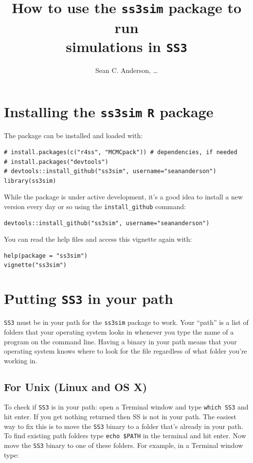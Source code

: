 \documentclass[12pt]{article}
\title{How to use the \texttt{ss3sim} package to run\\simulations in \texttt{SS3}}
\author{Sean C. Anderson, \ldots}
\date{}
\begin{document}
\maketitle

\section{Installing the \texttt{ss3sim} \texttt{R} package}

The package can be installed and loaded with:

\begin{verbatim}
# install.packages(c("r4ss", "MCMCpack")) # dependencies, if needed
# install.packages("devtools")
# devtools::install_github("ss3sim", username="seananderson")
library(ss3sim)
\end{verbatim}

\noindent
While the package is under active development, it's a good idea to install a 
new version every day or so using the \texttt{install\_github} command:

\begin{verbatim}
devtools::install_github("ss3sim", username="seananderson")
\end{verbatim}

\noindent
You can read the help files and access this vignette again with:

\begin{verbatim}
help(package = "ss3sim")
vignette("ss3sim")
\end{verbatim}

\section{Putting \texttt{SS3} in your path}
\texttt{SS3} must be in your path for the \texttt{ss3sim} package to work. Your 
``path'' is a list of folders that your operating system looks in whenever you 
type the name of a program on the command line. Having a binary in your path 
means that your operating system knows where to look for the file regardless of 
what folder you're working in. 

\subsection{For Unix (Linux and OS X)}
To check if \texttt{SS3} is in your path: open a Terminal window and type 
\texttt{which SS3} and hit enter. If you get nothing returned then SS is not in 
your path. The easiest way to fix this is to move the \texttt{SS3} binary to a 
folder that's already in your path. To find existing path folders type 
\texttt{echo \$PATH} in the terminal and hit enter. Now move the \texttt{SS3} 
binary to one of these folders. For example, in a Terminal window type:
\end{document}

